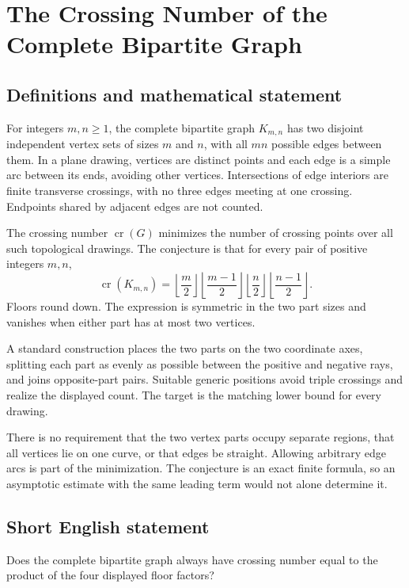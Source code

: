 \documentclass[11pt,a4paper]{article}
\begin{document}
\section*{The Crossing Number of the Complete Bipartite Graph}\label{statement}

\subsection{Definitions and mathematical statement}
For integers $m,n\ge1$, the complete bipartite graph $K_{m,n}$ has
two disjoint independent vertex sets of sizes $m$ and $n$, with all
$mn$ possible edges between them. In a plane drawing, vertices are
distinct points and each edge is a simple arc between its ends,
avoiding other vertices. Intersections of edge interiors are finite
transverse crossings, with no three edges meeting at one crossing.
Endpoints shared by adjacent edges are not counted.

The crossing number $\operatorname{cr}(G)$ minimizes the number of
crossing points over all such topological drawings. The conjecture
is that for every pair of positive integers $m,n$,
\[
 \operatorname{cr}(K_{m,n})=
       \left\lfloor\frac m2\right\rfloor
       \left\lfloor\frac{m-1}2\right\rfloor
       \left\lfloor\frac n2\right\rfloor
       \left\lfloor\frac{n-1}2\right\rfloor.
\]
Floors round down. The expression is symmetric in the two part sizes
and vanishes when either part has at most two vertices.

A standard construction places the two parts on the two coordinate
axes, splitting each part as evenly as possible between the positive
and negative rays, and joins opposite-part pairs. Suitable generic
positions avoid triple crossings and realize the displayed count.
The target is the matching lower bound for every drawing.

There is no requirement that the two vertex parts occupy separate
regions, that all vertices lie on one curve, or that edges be
straight. Allowing arbitrary edge arcs is part of the minimization.
The conjecture is an exact finite formula, so an asymptotic estimate
with the same leading term would not alone determine it.
\subsection{Short English statement}
Does the complete bipartite graph always have crossing number equal to the product of the four displayed floor factors?
\end{document}
